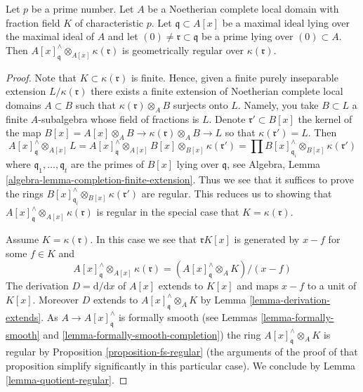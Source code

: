 \begin{lemma}
\label{lemma-another-helper-G-ring}
Let $p$ be a prime number. Let $A$ be a Noetherian complete local domain
with fraction field $K$ of characteristic $p$. Let $\mathfrak q \subset A[x]$
be a maximal ideal lying over the maximal ideal of $A$ and let
$(0) \not = \mathfrak r \subset \mathfrak q$ be a prime lying over
$(0) \subset A$. Then
$A[x]_\mathfrak q^\wedge \otimes_{A[x]} \kappa(\mathfrak r)$ is geometrically
regular over $\kappa(\mathfrak r)$.
\end{lemma}

\begin{proof}
Note that $K \subset \kappa(\mathfrak r)$ is finite.
Hence, given a finite purely
inseparable extension $L/\kappa(\mathfrak r)$ there exists a finite
extension of Noetherian complete local domains $A \subset B$ such that
$\kappa(\mathfrak r) \otimes_A B$ surjects onto $L$.
Namely, you take $B \subset L$
a finite $A$-subalgebra whose field of fractions is $L$. Denote
$\mathfrak r' \subset B[x]$ the kernel of the map
$B[x] = A[x] \otimes_A B \to \kappa(\mathfrak r) \otimes_A B \to L$
so that $\kappa(\mathfrak r') = L$. Then
$$
A[x]_\mathfrak q^\wedge \otimes_{A[x]} L =
A[x]_\mathfrak q^\wedge \otimes_{A[x]} B[x]
\otimes_{B[x]} \kappa(\mathfrak r') =
\prod B[x]_{\mathfrak q_i}^\wedge \otimes_{B[x]} \kappa(\mathfrak r')
$$
where $\mathfrak q_1, \ldots, \mathfrak q_t$ are the primes of $B[x]$
lying over $\mathfrak q$, see
Algebra, Lemma \ref{algebra-lemma-completion-finite-extension}.
Thus we see that it suffices to prove the rings
$B[x]_{\mathfrak q_i}^\wedge \otimes_{B[x]} \kappa(\mathfrak r')$
are regular. This reduces us to showing that
$A[x]_\mathfrak q^\wedge \otimes_{A[x]} \kappa(\mathfrak r)$
is regular in the special case that $K = \kappa(\mathfrak r)$.

\medskip\noindent
Assume $K = \kappa(\mathfrak r)$. In this case we see that
$\mathfrak r K[x]$ is generated by $x - f$ for some $f \in K$
and
$$
A[x]_\mathfrak q^\wedge \otimes_{A[x]} \kappa(\mathfrak r)
=
(A[x]_\mathfrak q^\wedge \otimes_A K)/(x - f)
$$
The derivation $D = \text{d}/\text{d}x$ of $A[x]$ extends to $K[x]$ and
maps $x - f$ to a unit of $K[x]$. Moreover $D$ extends to
$A[x]_\mathfrak q^\wedge \otimes_A K$ by Lemma \ref{lemma-derivation-extends}.
As $A \to A[x]_\mathfrak q^\wedge$ is formally smooth (see
Lemmas \ref{lemma-formally-smooth} and
\ref{lemma-formally-smooth-completion})
the ring $A[x]_\mathfrak q^\wedge \otimes_A K$ is regular by
Proposition \ref{proposition-fs-regular} (the arguments of the
proof of that proposition simplify significantly in this particular case).
We conclude by Lemma \ref{lemma-quotient-regular}.
\end{proof}

